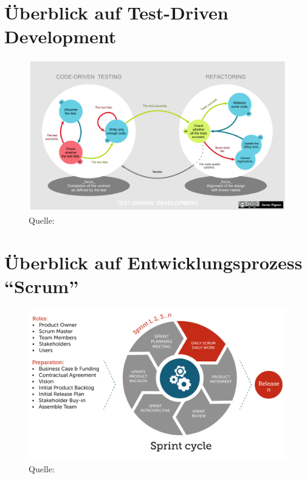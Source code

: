 \documentclass[12pt,DIV14,BCOR10mm,a4paper,twoside,parskip=half-,headsepline,headinclude,english,ngerman,bibliography=totocnumbered]{scrreprt}
\begin{document}
\begin{appendices}


\chapter{Überblick auf Test-Driven Development}
\begin{figure}[!htb]
  \includegraphics[width=\textwidth,height=0.85\textheight,keepaspectratio]{./images/1920px-TDD_Global_Lifecycle.png}
  \caption{Quelle: \autocite{TDD.Picture}}
  \label{figure:tdd-overview}
\end{figure}

\chapter{Überblick auf Entwicklungsprozess \enquote{Scrum}}
\begin{figure}[!htb]
  \includegraphics[width=\textwidth,height=0.9\textheight,keepaspectratio]{./images/the-daily-scrum-in-the-sprint-cycle.png}
  \caption{Quelle: \autocite{ManifestoDigital}}
  \label{figure:scrum-overview}
\end{figure}

\end{appendices}


\end{document}
